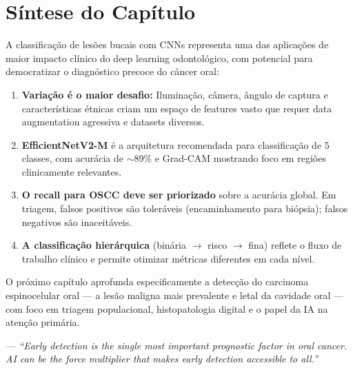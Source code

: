 \section{Síntese do Capítulo}
\label{sec:sintese-10}

A classificação de lesões bucais com CNNs representa uma das aplicações de
maior impacto clínico do deep learning odontológico, com potencial para
democratizar o diagnóstico precoce do câncer oral:

\begin{enumerate}
  \item \textbf{Variação é o maior desafio:} Iluminação, câmera, ângulo de
        captura e características étnicas criam um espaço de features vasto
        que requer data augmentation agressiva e datasets diversos.
  \item \textbf{EfficientNetV2-M} é a arquitetura recomendada para classificação
        de 5 classes, com acurácia de $\sim$89\% e Grad-CAM mostrando foco em
        regiões clinicamente relevantes.
  \item \textbf{O recall para OSCC deve ser priorizado} sobre a acurácia global.
        Em triagem, falsos positivos são toleráveis (encaminhamento para biópsia);
        falsos negativos são inaceitáveis.
  \item \textbf{A classificação hierárquica} (binária $\to$ risco $\to$ fina)
        reflete o fluxo de trabalho clínico e permite otimizar métricas diferentes
        em cada nível.
\end{enumerate}

O próximo capítulo aprofunda especificamente a detecção do carcinoma espinocelular
oral --- a lesão maligna mais prevalente e letal da cavidade oral --- com foco em
triagem populacional, histopatologia digital e o papel da IA na atenção primária.

\begin{flushright}
\itshape\small
--- ``Early detection is the single most important prognostic factor in oral cancer.
AI can be the force multiplier that makes early detection accessible to all.''
\end{flushright}

